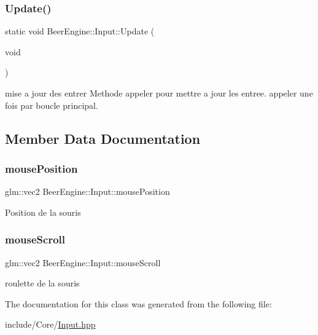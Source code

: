 \subsubsection{\texorpdfstring{Update()}{Update()}}
{\footnotesize\ttfamily static void Beer\+Engine\+::\+Input\+::\+Update (\begin{DoxyParamCaption}\item[{void}]{ }\end{DoxyParamCaption})\hspace{0.3cm}{\ttfamily [static]}}



mise a jour des entrer Methode appeler pour mettre a jour les entree. appeler une fois par boucle principal. 



\subsection{Member Data Documentation}
\mbox{\label{class_beer_engine_1_1_input_ae232daf7243afe948422d0b3bb14d2d2}} 
\subsubsection{\texorpdfstring{mouse\+Position}{mousePosition}}
{\footnotesize\ttfamily glm\+::vec2 Beer\+Engine\+::\+Input\+::mouse\+Position\hspace{0.3cm}{\ttfamily [static]}}

Position de la souris \mbox{\label{class_beer_engine_1_1_input_aaba670f7f093d65462f47cb46f8810bc}} 
\subsubsection{\texorpdfstring{mouse\+Scroll}{mouseScroll}}
{\footnotesize\ttfamily glm\+::vec2 Beer\+Engine\+::\+Input\+::mouse\+Scroll\hspace{0.3cm}{\ttfamily [static]}}

roulette de la souris 

The documentation for this class was generated from the following file\+:\begin{DoxyCompactItemize}
\item 
include/\+Core/\mbox{\hyperlink{_input_8hpp}{Input.\+hpp}}\end{DoxyCompactItemize}
